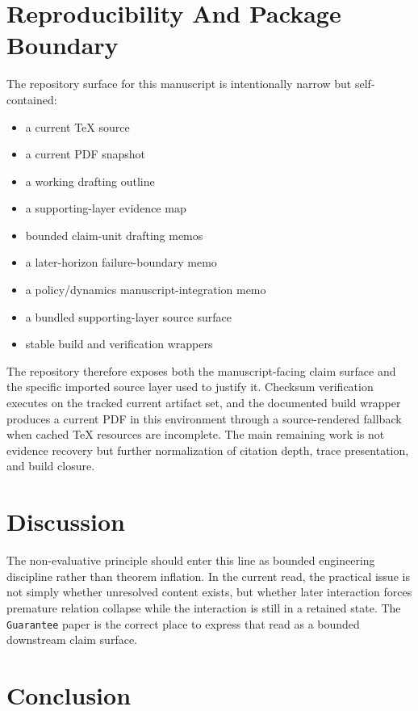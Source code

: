 \documentclass[11pt]{article}
\begin{document}
\section{Reproducibility And Package Boundary}

The repository surface for this manuscript is intentionally narrow but
self-contained:
\begin{itemize}
\item a current TeX source
\item a current PDF snapshot
\item a working drafting outline
\item a supporting-layer evidence map
\item bounded claim-unit drafting memos
\item a later-horizon failure-boundary memo
\item a policy/dynamics manuscript-integration memo
\item a bundled supporting-layer source surface
\item stable build and verification wrappers
\end{itemize}

The repository therefore exposes both the manuscript-facing claim surface and
the specific imported source layer used to justify it. Checksum verification
executes on the tracked current artifact set, and the documented build wrapper
produces a current PDF in this environment through a source-rendered fallback
when cached TeX resources are incomplete. The main remaining work is not
evidence recovery but further normalization of citation depth, trace
presentation, and build closure.

\section{Discussion}

The non-evaluative principle should enter this line as bounded engineering
discipline rather than theorem inflation. In the current read, the practical issue
is not simply whether unresolved content exists, but whether later interaction
forces premature relation collapse while the interaction is still in a retained
state. The \texttt{Guarantee} paper is the correct place to express that read as
a bounded downstream claim surface.

\section{Conclusion}
\end{document}
